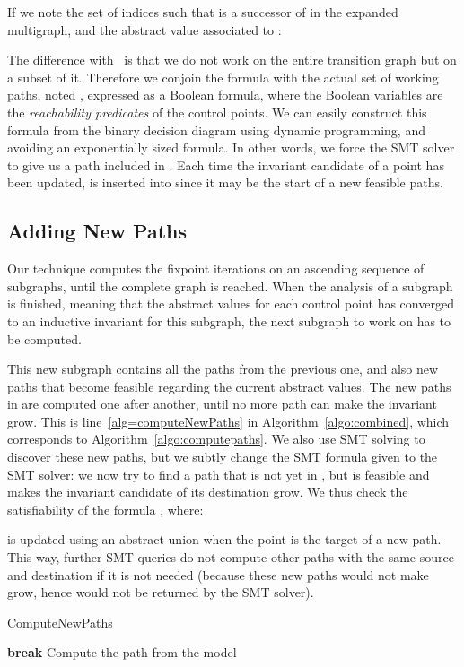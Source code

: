 If we note  the set of indices  such that  is a
successor of  in the expanded multigraph, and  the abstract value
associated to  :

The difference with~\cite{Monniaux_Gonnord_SAS11} is that we do not
work on the entire transition graph but on a subset of it. Therefore we
conjoin the formula  with the actual set of working paths,
noted , expressed as a Boolean formula, where the Boolean variables are the
\emph{reachability predicates} of the control points. We can easily construct
this formula from the binary decision diagram using dynamic programming, and
avoiding an exponentially sized formula. In other words, we force the SMT solver
to give us a path included in .
Each time the invariant candidate of a point  has been updated,  is
inserted into  since it may be the start of a new feasible paths.

\subsection{Adding New Paths}
\label{subsec:addingpaths}

Our technique computes the fixpoint iterations on an ascending sequence of
subgraphs, until the complete graph is reached.
When the analysis of a subgraph is finished, meaning that the abstract values
for each control point has converged to an inductive invariant for this subgraph,
the next subgraph to work on has to be computed.

This new subgraph contains all the paths from the previous one, and also new
paths that become feasible regarding the current abstract values.
The new paths in  are computed one after another, until no more path
can make the invariant grow. This is line~\ref{alg=computeNewPaths} in
Algorithm~\ref{algo:combined}, which corresponds to
Algorithm~\ref{algo:computepaths}. We also use SMT solving to discover
these new paths, but we subtly change the SMT formula given to the
SMT solver: we now try to find a path that is not yet in , but is feasible
and makes the invariant candidate of its destination grow.
We thus check the satisfiability of the formula
, where:

 is updated using an abstract union when the point  is the target of a new path. This way, further SMT queries do not
compute other paths with the same source and destination if it is not needed
(because these new paths would not make  grow, hence would not be returned
by the SMT solver).

\begin{algorithm}
	\caption{ComputeNewPaths}
	\label{algo:computepaths}
	\begin{algorithmic}[1] 
	\STATE 
	\IF {}
		\STATE \textbf{break}
	\ENDIF
	\STATE Compute the path  from the model
	\STATE 
	\STATE 
	\STATE 
	\STATE 
\ENDWHILE
 	\end{algorithmic}
\end{algorithm}

